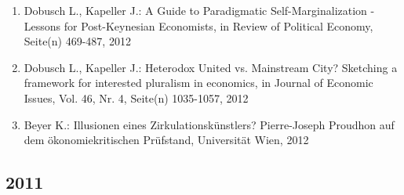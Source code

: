 \begin{enumerate}
	 \item Dobusch L., Kapeller J.: A Guide to Paradigmatic Self-Marginalization - Lessons for Post-Keynesian Economists, in Review of Political Economy, Seite(n) 469-487, 2012
	 \item Dobusch L., Kapeller J.: Heterodox United vs. Mainstream City? Sketching a framework for interested pluralism in economics, in Journal of Economic Issues, Vol. 46, Nr. 4, Seite(n) 1035-1057, 2012
	 \item Beyer K.: Illusionen eines Zirkulationskünstlers? Pierre-Joseph Proudhon auf dem ökonomiekritischen Prüfstand, Universität Wien, 2012
\end{enumerate}
\subsection*{2011}
